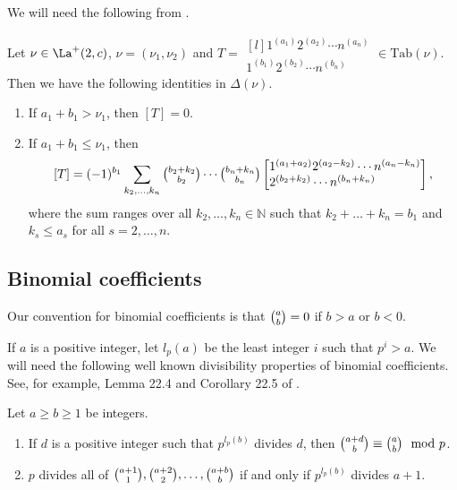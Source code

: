 We will need the following from \cite[Lemma 4.2]{MS3}.
\begin{lemma}\label{lem15}Let $\nu \in \La^+(2,c)$, $\nu=(\nu_1,\nu_2)$ and $T=\begin{matrix*}[l]
		1^{(a_1)}2^{(a_2)}  \cdots   n^{(a_n)} \\
		1^{(b_1)}2^{(b_2)}  \cdots  n^{(b_n)}
	\end{matrix*} \in \mathrm{Tab} (\nu)$.
	Then we have the following identities in $\Delta{(\nu)}$.
	\begin{enumerate}
		\item If $a_1+b_1>\nu_1$, then $[T]=0$.
		\item If $a_1+b_1 \le \nu_1$, then 
		\[[T]=(-1)^{b_1}\sum_{k_2,\dots,k_n}\tbinom{b_2+k_2}{b_2}\cdots\tbinom{b_n+k_n}{b_n}
		\begin{bmatrix*}[l]
			1^{(a_1+a_2)}2^{(a_2-k_2)}  \cdots   n^{(a_n-k_n)} \\
			2^{(b_2+k_2)}  \cdots  n^{(b_n+k_n)}
		\end{bmatrix*},
		\] where the sum ranges over all  $k_2,\dots,k_n \in \mathbb{N}$
		such that  $k_2+\dots+k_n=b_1 $ and $k_s \le a_s$ for all $s=2,\dots,n$.	\end{enumerate}	
\end{lemma}

\subsection{Binomial coefficients}\label{s2.5}
Our convention for binomial coefficients is that $\tbinom{a}{b}=0$ if $b>a$ or $b<0$.

If $a$ is a positive integer, let $l_p(a)$ be the least integer $i$ such that $p^i>a$. We will need the following well known divisibility properties of binomial coefficients. See, for example, Lemma 22.4 and Corollary 22.5 of \cite{Jam}.
\begin{lemma}\label{bin1}
	Let $a \ge b \ge 1$ be integers. \begin{enumerate}
		\item If $d$ is a positive integer such that $ p^{l_p(b)}$ divides $d$, then $\tbinom{a+d}{b} \equiv \tbinom{a}{b} \mod p $.
		\item $p$ divides all of $\tbinom{a+1}{1}, \tbinom{a+2}{2}, \dots, \tbinom{a+b}{b}$ if and only if $p^{l_{p}(b)}$ divides $a+1$.
	\end{enumerate}
\end{lemma}

